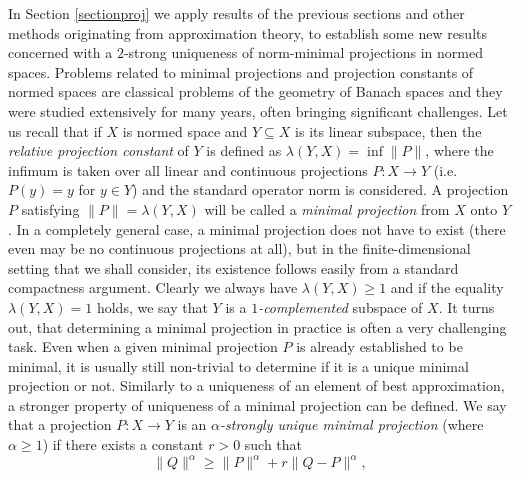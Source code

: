 \documentclass[12pt, reqno]{amsart}
\theoremstyle{definition}
\theoremstyle{remark}
\numberwithin{equation}{section}
\begin{document}
In Section \ref{sectionproj} we apply results of the previous sections and other methods originating from approximation theory, to establish some new results concerned with a $2$-strong uniqueness of norm-minimal projections in normed spaces. Problems related to minimal projections and projection constants of normed spaces are classical problems of the geometry of Banach spaces and they were studied extensively for many years, often bringing significant challenges. Let us recall that if $X$ is normed space and $Y \subseteq X$ is its linear subspace, then the \emph{relative projection constant} of $Y$ is defined as $\lambda(Y, X) = \inf  \|P\|$, where the infimum is taken over all linear and continuous projections $P: X \to Y$ (i.e. $P(y)=y$ for $y \in Y$) and the standard operator norm is considered. A projection $P$ satisfying $\|P\|=\lambda(Y, X)$ will be called a \emph{minimal projection} from $X$ onto $Y$. In a completely general case, a minimal projection does not have to exist (there even may be no continuous projections at all), but in the finite-dimensional setting that we shall consider, its existence follows easily from a standard compactness argument. Clearly we always have $\lambda(Y, X) \geq 1$ and if the equality $\lambda(Y, X)=1$ holds, we say that $Y$ is a \emph{$1$-complemented} subspace of $X$. It turns out, that determining a minimal projection in practice is often a very challenging task. Even when a given minimal projection $P$ is already established to be minimal, it is usually still non-trivial to determine if it is a unique minimal projection or not. Similarly to a uniqueness of an element of best approximation, a stronger property of uniqueness of a minimal projection can be defined. We say that a projection $P: X \to Y$ is an \emph{$\alpha$-strongly unique minimal projection} (where $\alpha \geq 1$) if there exists a constant $r>0$ such that
$$\|Q\|^{\alpha} \geq \|P\|^{\alpha} + r\|Q-P\|^{\alpha},$$
\end{document}
